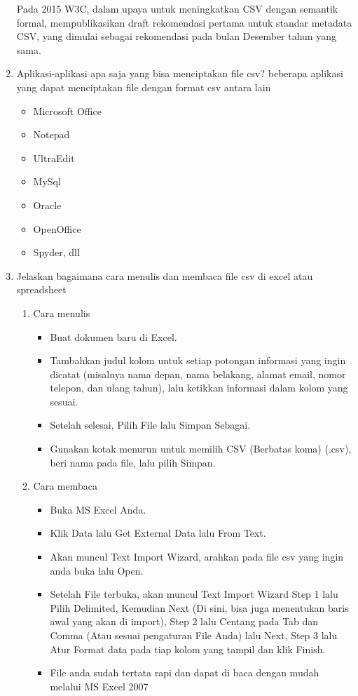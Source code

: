 \begin{enumerate}
	\par Pada 2015 W3C, dalam upaya untuk meningkatkan CSV dengan semantik formal, mempublikasikan draft rekomendasi pertama untuk standar metadata CSV, yang dimulai sebagai rekomendasi pada bulan Desember tahun yang sama. 
		      
    \item Aplikasi-aplikasi apa saja yang bisa menciptakan file csv?
   	beberapa aplikasi yang dapat menciptakan file dengan format csv antara lain 
   	\begin{itemize}
   	\item Microsoft Office  
   	\item Notepad 
   	\item UltraEdit
   	\item MySql
   	\item Oracle  			
   	\item OpenOffice
   	\item Spyder, dll
   	\end{itemize}
   
	\item Jelaskan bagaimana cara menulis dan membaca file csv di excel atau spreadsheet
		\begin{enumerate}
		\item Cara menulis	 
        \begin{itemize}
        \item Buat dokumen baru di Excel.
        \item Tambahkan judul kolom untuk setiap potongan informasi yang ingin dicatat (misalnya nama depan, nama belakang, alamat email, nomor telepon, dan ulang tahun), lalu ketikkan informasi dalam kolom yang sesuai.
        \item Setelah selesai, Pilih File lalu Simpan Sebagai.
        \item Gunakan kotak menurun untuk memilih CSV (Berbatas koma) (.csv), beri nama pada file, lalu pilih Simpan.
   	    \end{itemize}
        \item Cara membaca
        \begin{itemize}
        \item Buka MS Excel Anda.
        \item Klik Data lalu Get External Data lalu From Text.
        \item Akan muncul Text Import Wizard, arahkan pada file csv yang ingin anda buka lalu Open.
        \item Setelah File terbuka, akan muncul Text Import Wizard Step 1 lalu Pilih Delimited, Kemudian Next (Di sini, bisa juga menentukan baris awal yang akan di import), Step 2 lalu Centang pada Tab dan Comma (Atau sesuai pengaturan File Anda) lalu Next, Step 3 lalu Atur Format data pada tiap kolom yang tampil dan klik Finish.
        \item File anda sudah tertata rapi dan dapat di baca dengan mudah melalui MS Excel 2007
    \end{itemize}	
	\end{enumerate}
	

\end{enumerate}
